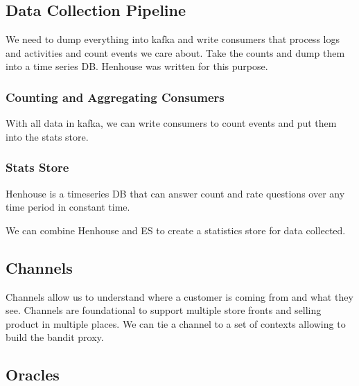 \documentclass[11pt]{article}
\begin{document}


\subsection{Data Collection Pipeline}
We need to dump everything into kafka and write consumers that process logs
and activities and count events we care about. Take the counts and dump them
into a time series DB. Henhouse was written for this purpose. 

\subsubsection{Counting and Aggregating Consumers }
With all data in kafka, we can write consumers to count events and put them into
the stats store.

\subsubsection{Stats Store}
Henhouse is a timeseries DB that can answer count and rate questions over any
time period in constant time.

We can combine Henhouse and ES to create a statistics store for data collected.

\subsection{Channels}

Channels allow us to understand where a customer is coming from and what they see.
Channels are foundational to support multiple store fronts and selling product in
multiple places. We can tie a channel to a set of contexts allowing to build the 
bandit proxy.

\subsection{Oracles}
\end{document}
